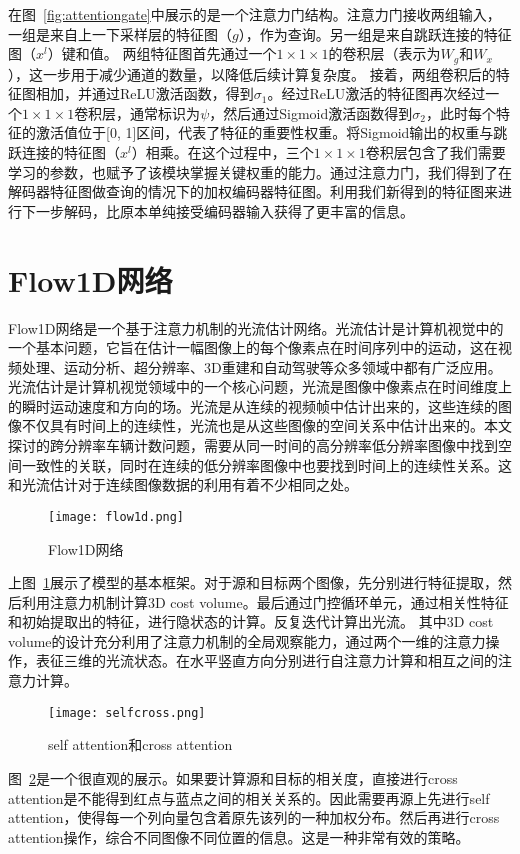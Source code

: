 在图~\ref{fig:attentiongate}中展示的是一个注意力门结构。注意力门接收两组输入，一组是来自上一下采样层的特征图（\(g\)），作为查询。另一组是来自跳跃连接的特征图（\(x^l\)）键和值。
两组特征图首先通过一个\(1 \times 1 \times 1\)的卷积层（表示为\(W_g\)和\(W_x\)），这一步用于减少通道的数量，以降低后续计算复杂度。
接着，两组卷积后的特征图相加，并通过ReLU激活函数，得到\( \sigma_1\)。经过ReLU激活的特征图再次经过一个\(1 \times 1 \times 1\)卷积层，通常标识为\(\psi\)，然后通过Sigmoid激活函数得到\( \sigma_2\)，此时每个特征的激活值位于[0, 1]区间，代表了特征的重要性权重。将Sigmoid输出的权重与跳跃连接的特征图（\(x^l\)）相乘。在这个过程中，三个\(1 \times 1 \times 1\)卷积层包含了我们需要学习的参数，也赋予了该模块掌握关键权重的能力。通过注意力门，我们得到了在解码器特征图做查询的情况下的加权编码器特征图。利用我们新得到的特征图来进行下一步解码，比原本单纯接受编码器输入获得了更丰富的信息。

\section{Flow1D网络}
Flow1D网络是一个基于注意力机制的光流估计网络。光流估计是计算机视觉中的一个基本问题，它旨在估计一幅图像上的每个像素点在时间序列中的运动，这在视频处理、运动分析、超分辨率、3D重建和自动驾驶等众多领域中都有广泛应用。光流估计是计算机视觉领域中的一个核心问题，光流是图像中像素点在时间维度上的瞬时运动速度和方向的场。光流是从连续的视频帧中估计出来的，这些连续的图像不仅具有时间上的连续性，光流也是从这些图像的空间关系中估计出来的。本文探讨的跨分辨率车辆计数问题，需要从同一时间的高分辨率低分辨率图像中找到空间一致性的关联，同时在连续的低分辨率图像中也要找到时间上的连续性关系。这和光流估计对于连续图像数据的利用有着不少相同之处。

\begin{figure}[h]
  \centering
  \texttt{[image: flow1d.png]}
  \caption{Flow1D网络}
  \label{fig:Flow1D}
\end{figure}

上图~\ref{fig:Flow1D}展示了模型的基本框架。对于源和目标两个图像，先分别进行特征提取，然后利用注意力机制计算3D cost volume。最后通过门控循环单元，通过相关性特征和初始提取出的特征，进行隐状态的计算。反复迭代计算出光流。
其中3D cost volume的设计充分利用了注意力机制的全局观察能力，通过两个一维的注意力操作，表征三维的光流状态。在水平竖直方向分别进行自注意力计算和相互之间的注意力计算。

\begin{figure}[h]
  \centering
  \texttt{[image: selfcross.png]}
  \caption{self attention和cross attention}
  \label{fig:selfcross}
\end{figure}

图~\ref{fig:selfcross}是一个很直观的展示。如果要计算源和目标的相关度，直接进行cross attention是不能得到红点与蓝点之间的相关关系的。因此需要再源上先进行self attention，使得每一个列向量包含着原先该列的一种加权分布。然后再进行cross attention操作，综合不同图像不同位置的信息。这是一种非常有效的策略。



